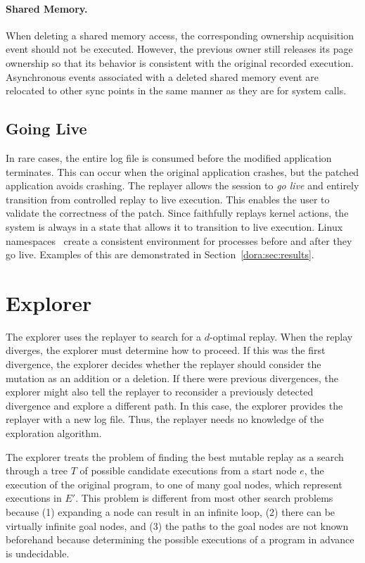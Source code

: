\paragraph{Shared Memory.}
When deleting a shared memory access, the corresponding ownership
acquisition event should not be executed.  However, the previous owner
still releases its page ownership so that its behavior is consistent
with the original recorded execution. Asynchronous events associated with a
deleted shared memory event are relocated to other sync points in the same
manner as they are for system calls.

\subsection{Going Live}
In rare cases, the entire log file is
consumed before the modified application terminates. This can occur when the
original application crashes, but the patched application avoids crashing. The
replayer allows the session to \emph{go live} and entirely transition from
controlled replay to live execution. This enables the user to
validate the correctness of the patch.
Since {\dora} faithfully replays kernel actions, the system is always in a state that allows
it to transition to live execution. Linux namespaces~\cite{namespaces:linux06}
create a consistent environment for processes before and after they go live.
Examples of this are demonstrated in Section~\ref{dora:sec:results}.
\section{Explorer}
\label{dora:sec:explorer}

The explorer uses the replayer to search for a $d$-optimal replay. When the
replay diverges, the explorer must determine how to proceed.
If this was the first divergence, the
explorer decides whether the replayer should consider the mutation as
an addition or a deletion. If there were previous divergences, the
explorer might also tell the replayer to reconsider a previously
detected divergence and explore a different path. In this case, the
explorer provides the replayer with a new log file.  Thus, the 
replayer needs no knowledge of the exploration algorithm.

The explorer treats the problem of finding the best mutable replay as
a search through a tree $T$ of possible candidate executions from a
start node $e$, the execution of the original program, to one of
many goal nodes, which represent executions in $E'$.
This problem is different from most other search problems because
(1) expanding a node can result in an infinite loop,
(2) there can be virtually infinite goal nodes, and
(3) the paths to the
goal nodes are not known beforehand because determining the possible
executions of a program in advance is undecidable.

